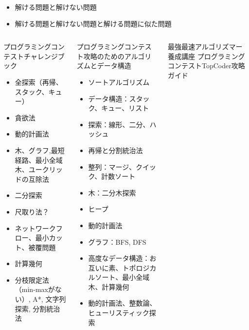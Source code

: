 \documentclass{beamer}
\begin{document}
\begin{frame}[fragile]{}{}
\begin{itemize}\itemsep8pt
\item 解ける問題と解けない問題
\item 解ける問題と解けない問題と解ける問題に似た問題
\end{itemize}

\vfill
{\fontsize{4}{6}\selectfont
\begin{columns}[T]
\begin{column}{0.3\textwidth}
プログラミングコンテストチャレンジブック
\begin{itemize}
\item 全探索（再帰、スタック、キュー）
\item 貪欲法
\item 動的計画法
\item 木、グラフ,最短経路、最小全域木、ユークリッドの互除法
\item 二分探索
\item 尺取り法？
\item ネットワークフロー、最小カット、被覆問題
\item 計算幾何
\item 分枝限定法（min-maxがない）, A*, 文字列探索, 分割統治法
\end{itemize}
\end{column}
\begin{column}{0.3\textwidth}
プログラミングコンテスト攻略のためのアルゴリズムとデータ構造
\begin{itemize}
\item ソートアルゴリズム
\item データ構造：スタック、キュー、リスト
\item 探索：線形、二分、ハッシュ
\item 再帰と分割統治法
\item 整列：マージ、クイック、計数ソート
\item 木：二分木探索
\item ヒープ
\item 動的計画法
\item グラフ：BFS, DFS
\item 高度なデータ構造：お互いに素、トポロジカルソート、最小全域木、計算幾何
\item 動的計画法、整数論、ヒューリスティック探索
\end{itemize}
\end{column}
\begin{column}{0.3\textwidth}
最強最速アルゴリズマー養成講座 プログラミングコンテストTopCoder攻略ガイド

\end{column}
\end{columns}}
\end{frame}
\end{document}

